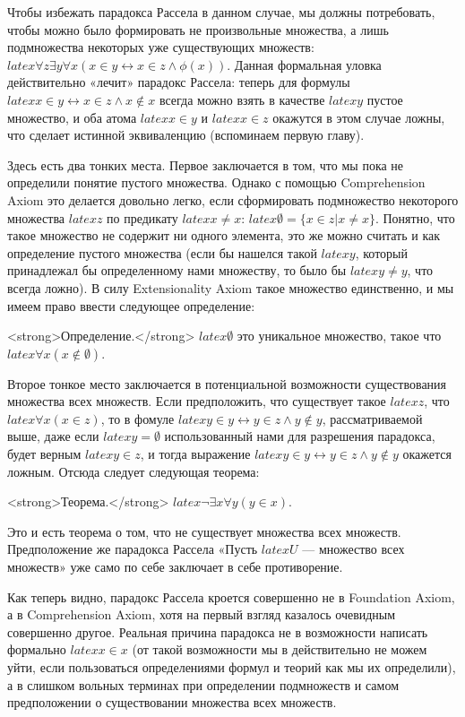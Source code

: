 Чтобы избежать парадокса Рассела в данном случае, мы должны потребовать, чтобы можно было формировать не произвольные множества, а лишь подмножества некоторых уже существующих множеств: $latex \forall z \exists y \forall x (x\in y \leftrightarrow x \in z \wedge \phi(x))$. Данная формальная уловка действительно «лечит» парадокс Рассела: теперь для формулы $latex x \in y \leftrightarrow x \in z \wedge x\not \in x$ всегда можно взять в качестве $latex y$ пустое множество, и оба атома $latex x \in y$ и $latex x \in z$ окажутся в этом случае ложны, что сделает истинной эквиваленцию (вспоминаем первую главу).

Здесь есть два тонких места. Первое заключается в том, что мы пока не определили понятие пустого множества. Однако с помощью Comprehension Axiom это делается довольно легко, если сформировать подмножество некоторого множества $latex z$ по предикату $latex x \not= x$: $latex \emptyset = \{x \in z |x \not= x\}$. Понятно, что такое множество не содержит ни одного элемента, это же можно считать и как определение пустого множества (если бы нашелся такой $latex y$, который принадлежал бы определенному нами множеству, то было бы $latex y\not= y$, что всегда ложно). В силу Extensionality Axiom такое множество единственно, и мы имеем право ввести следующее определение:

<strong>Определение.</strong> $latex \emptyset$ это уникальное множество, такое что $latex \forall x (x\not\in \emptyset)$.

Второе тонкое место заключается в потенциальной возможности существования множества всех множеств. Если предположить, что существует такое $latex z$, что $latex \forall x (x \in z)$, то в фомуле $latex y \in y \leftrightarrow y\in z \wedge y \not \in y$, рассматриваемой выше, даже если $latex y = \emptyset$ использованный нами для разрешения парадокса, будет верным $latex y \in z$, и тогда выражение $latex y \in y \leftrightarrow y\in z \wedge y \not \in y$ окажется ложным. Отсюда следует следующая теорема:

<strong>Теорема.</strong> $latex \neg \exists x \forall y (y \in x)$.

Это и есть теорема о том, что не существует множества всех множеств. Предположение же парадокса Рассела «Пусть $latex U$ — множество всех множеств» уже само по себе заключает в себе противорение.

Как теперь видно, парадокс Рассела кроется совершенно не в Foundation Axiom, а в Comprehension Axiom, хотя на первый взгляд казалось очевидным совершенно другое. Реальная причина парадокса не в возможности написать формально $latex x\in x$ (от такой возможности мы в действительно не можем уйти, если пользоваться определениями формул и теорий как мы их определили), а в слишком вольных терминах при определении подмножеств и самом предположении о существовании множества всех множеств.

